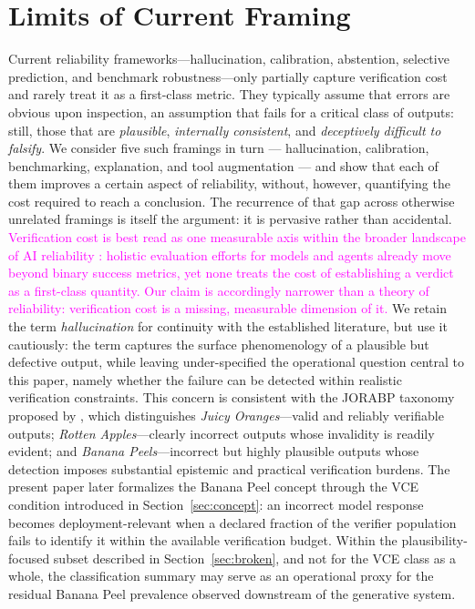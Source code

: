 \documentclass[11pt]{article}
\newcommand{\rev}[1]{\textcolor{magenta}{#1}}
\newcommand{\tidy}[1]{\textcolor{blue!60!black}{#1}}
\newcommand{\viola}[1]{\textcolor[HTML]{7030A0}{#1}}
\newcommand{\rev}[1]{#1}
\newcommand{\tidy}[1]{#1}
\newcommand{\viola}[1]{#1}
\begin{document}
\section{Limits of Current Framing}
\label{sec:limits}

{Current reliability frameworks---hallucination, calibration, abstention, selective prediction, and benchmark robustness---only partially capture verification cost and rarely treat it as a first-class metric. They typically assume that errors are obvious upon inspection, an assumption that fails for a critical class of outputs: still, those that are \emph{plausible}, \emph{internally consistent}, and \emph{deceptively difficult to falsify}.}
\tidy{We consider five such framings in turn --- hallucination, calibration, benchmarking, explanation, and tool augmentation --- and show that each of them improves a certain aspect of reliability, without, however, quantifying the cost required to reach a conclusion. The recurrence of that gap across otherwise unrelated framings is itself the argument: it is pervasive rather than accidental.}
\rev{Verification cost is best read as one measurable axis within the broader landscape of AI reliability \citep{rabanser2026reliability}: holistic evaluation efforts for models \citep{liang2023helm} and agents \citep{kapoor2026hal} already move beyond binary success metrics, yet none treats the cost of establishing a verdict as a first-class quantity. Our claim is accordingly narrower than a theory of reliability: verification cost is a missing, measurable dimension of it.}
{We retain the term \emph{hallucination} for continuity with the established literature, but use it cautiously: the term captures the surface phenomenology of a plausible but defective output, while leaving under-specified the operational question central to this paper, namely whether the failure can be detected within realistic verification constraints. This concern is consistent with the JORABP taxonomy proposed by \citet{Immediato2025-POM}, which distinguishes \emph{Juicy Oranges}---valid and reliably verifiable outputs; \emph{Rotten Apples}---clearly incorrect outputs whose invalidity is readily evident; and \emph{Banana Peels}---incorrect but highly plausible outputs whose detection imposes substantial epistemic and practical verification burdens. The present paper later formalizes the Banana Peel concept through the VCE condition introduced in Section~\ref{sec:concept}:
\viola{an incorrect model response becomes deployment-relevant when a declared fraction of the verifier population fails to identify it within the available verification budget.} \viola{Within the plausibility-focused subset described in Section~\ref{sec:broken}, and not for the VCE class as a whole, the classification summary may serve as an operational proxy for the residual Banana Peel prevalence observed downstream of the generative system.}}
\end{document}
